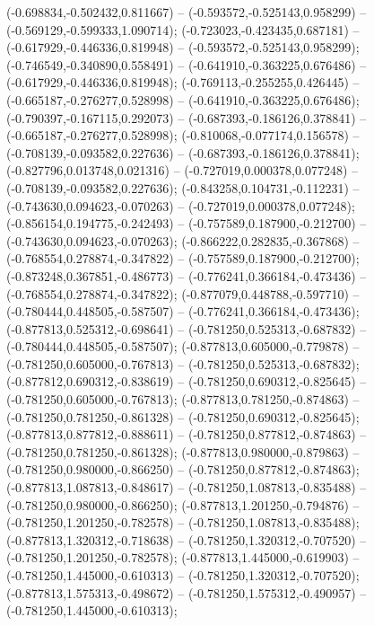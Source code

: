  (-0.698834,-0.502432,0.811667) -- (-0.593572,-0.525143,0.958299) -- (-0.569129,-0.599333,1.090714);
 (-0.723023,-0.423435,0.687181) -- (-0.617929,-0.446336,0.819948) -- (-0.593572,-0.525143,0.958299);
 (-0.746549,-0.340890,0.558491) -- (-0.641910,-0.363225,0.676486) -- (-0.617929,-0.446336,0.819948);
 (-0.769113,-0.255255,0.426445) -- (-0.665187,-0.276277,0.528998) -- (-0.641910,-0.363225,0.676486);
 (-0.790397,-0.167115,0.292073) -- (-0.687393,-0.186126,0.378841) -- (-0.665187,-0.276277,0.528998);
 (-0.810068,-0.077174,0.156578) -- (-0.708139,-0.093582,0.227636) -- (-0.687393,-0.186126,0.378841);
 (-0.827796,0.013748,0.021316) -- (-0.727019,0.000378,0.077248) -- (-0.708139,-0.093582,0.227636);
 (-0.843258,0.104731,-0.112231) -- (-0.743630,0.094623,-0.070263) -- (-0.727019,0.000378,0.077248);
 (-0.856154,0.194775,-0.242493) -- (-0.757589,0.187900,-0.212700) -- (-0.743630,0.094623,-0.070263);
 (-0.866222,0.282835,-0.367868) -- (-0.768554,0.278874,-0.347822) -- (-0.757589,0.187900,-0.212700);
 (-0.873248,0.367851,-0.486773) -- (-0.776241,0.366184,-0.473436) -- (-0.768554,0.278874,-0.347822);
 (-0.877079,0.448788,-0.597710) -- (-0.780444,0.448505,-0.587507) -- (-0.776241,0.366184,-0.473436);
 (-0.877813,0.525312,-0.698641) -- (-0.781250,0.525313,-0.687832) -- (-0.780444,0.448505,-0.587507);
 (-0.877813,0.605000,-0.779878) -- (-0.781250,0.605000,-0.767813) -- (-0.781250,0.525313,-0.687832);
 (-0.877812,0.690312,-0.838619) -- (-0.781250,0.690312,-0.825645) -- (-0.781250,0.605000,-0.767813);
 (-0.877813,0.781250,-0.874863) -- (-0.781250,0.781250,-0.861328) -- (-0.781250,0.690312,-0.825645);
 (-0.877813,0.877812,-0.888611) -- (-0.781250,0.877812,-0.874863) -- (-0.781250,0.781250,-0.861328);
 (-0.877813,0.980000,-0.879863) -- (-0.781250,0.980000,-0.866250) -- (-0.781250,0.877812,-0.874863);
 (-0.877813,1.087813,-0.848617) -- (-0.781250,1.087813,-0.835488) -- (-0.781250,0.980000,-0.866250);
 (-0.877813,1.201250,-0.794876) -- (-0.781250,1.201250,-0.782578) -- (-0.781250,1.087813,-0.835488);
 (-0.877813,1.320312,-0.718638) -- (-0.781250,1.320312,-0.707520) -- (-0.781250,1.201250,-0.782578);
 (-0.877813,1.445000,-0.619903) -- (-0.781250,1.445000,-0.610313) -- (-0.781250,1.320312,-0.707520);
 (-0.877813,1.575313,-0.498672) -- (-0.781250,1.575312,-0.490957) -- (-0.781250,1.445000,-0.610313);

